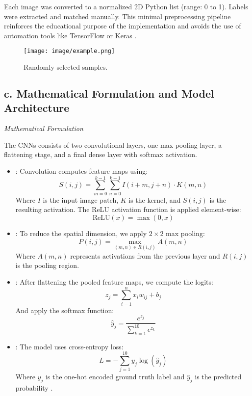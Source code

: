 \documentclass[conference]{IEEEtran}
\begin{document}
Each image was converted to a normalized 2D Python list (range: 0 to 1). Labels were extracted and matched manually. This minimal preprocessing pipeline reinforces the educational purpose of the implementation and avoids the use of automation tools like TensorFlow or Keras \cite{KerasUsers2017}.

\begin{figure} [!h]
    \centering
    \texttt{[image: image/example.png]}
    \caption{Randomly selected samples.}
    \label{fig:enter-label}
\end{figure}

\subsection*{c. Mathematical Formulation and Model Architecture}
\textit{Mathematical Formulation}

The CNNs consists of two convolutional layers, one max pooling layer, a flattening stage, and a final dense layer with softmax activation.

\begin{itemize}
    \item {}: Convolution computes feature maps using:
    \begin{equation}
        S(i, j) = \sum_{m=0}^{k-1} \sum_{n=0}^{k-1} I(i + m, j + n) \cdot K(m, n)
    \end{equation}
    Where $I$ is the input image patch, $K$ is the kernel, and $S(i, j)$ is the resulting activation. The ReLU activation function is applied element-wise:
    \begin{equation}
        \text{ReLU}(x) = \max(0, x)
    \end{equation}

    \item {}: To reduce the spatial dimension, we apply $2 \times 2$ max pooling:
    \begin{equation}
        P(i, j) = \max_{(m,n) \in R(i,j)} A(m, n)
    \end{equation}
    Where $A(m, n)$ represents activations from the previous layer and $R(i, j)$ is the pooling region.

    \item {}: After flattening the pooled feature maps, we compute the logits:
    \begin{equation}
        z_j = \sum_{i=1}^{n} x_i w_{ij} + b_j
    \end{equation}
    And apply the softmax function:
    \begin{equation}
        \hat{y}_j = \frac{e^{z_j}}{\sum_{k=1}^{10} e^{z_k}}
    \end{equation}

    \item {}: The model uses cross-entropy loss:
    \begin{equation}
        L = -\sum_{j=1}^{10} y_j \log(\hat{y}_j)
    \end{equation}
    Where $y_j$ is the one-hot encoded ground truth label and $\hat{y}_j$ is the predicted probability \cite{goodfellow2016deep}.
\end{itemize}
\end{document}
